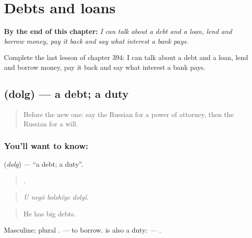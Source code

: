 
\chapter{Debts and loans}
\label{ch:ru-debts-and-loans}

\begin{chapteropening}
\textbf{By the end of this chapter:} \emph{I can talk about a debt and a loan, lend and borrow money, pay it back and say what interest a bank pays.}

Complete the last lesson of chapter 394: I can talk about a debt and a loan, lend and borrow money, pay it back and say what interest a bank pays.
\end{chapteropening}

\section[\texorpdfstring{\ru{долг} (dolg)}{долг (dolg)}]{ (dolg) — a debt; a duty}

\label{lesson:RU-C394-dolg}



\begin{quote}
Before the new one: say the Russian for a power of attorney, then the Russian for a will.
\end{quote}

\subsection*{You'll want to know: }
\textbf{} (\emph{dolg}) — \textquotedblleft{}a debt; a duty\textquotedblright{}.

\begin{quote}
   .
\end{quote}

\begin{quote}
\emph{U negó bolshíye dolgí.}
\end{quote}

\begin{quote}
He has big debts.
\end{quote}

Masculine; plural \emph{}. \emph{  } — to borrow. \emph{} is also a duty: \emph{  — }.

